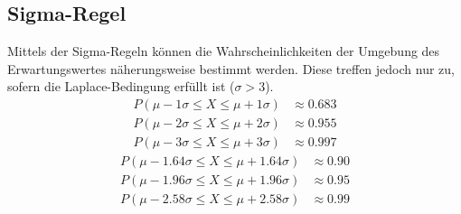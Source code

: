 \documentclass[a4paper]{article}
\begin{document}
		\subsection{Sigma-Regel}
			Mittels der Sigma-Regeln können die Wahrscheinlichkeiten der Umgebung des Erwartungswertes näherungsweise bestimmt werden. Diese treffen jedoch nur zu, sofern die Laplace-Bedingung erfüllt ist ($\sigma > 3$).
			\begin{subequations}
				\begin{align}
					P(\mu - 1\sigma \leq X \leq \mu + 1\sigma) &\approx 0.683\\
					P(\mu - 2\sigma \leq X \leq \mu + 2\sigma) &\approx 0.955\\
					P(\mu - 3\sigma \leq X \leq \mu + 3\sigma) &\approx 0.997
				\end{align}
			\end{subequations}
			\begin{subequations}
				\begin{align}
				P(\mu - 1.64\sigma \leq X \leq \mu + 1.64\sigma) &\approx 0.90\\
				P(\mu - 1.96\sigma \leq X \leq \mu + 1.96\sigma) &\approx 0.95\\
				P(\mu - 2.58\sigma \leq X \leq \mu + 2.58\sigma) &\approx 0.99
				\end{align}
			\end{subequations}
			
\end{document}
